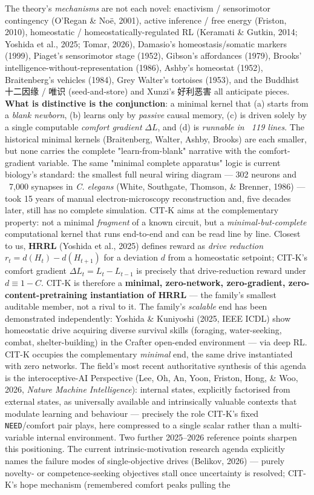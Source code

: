 \documentclass[11pt]{article}
\begin{document}
The theory's \emph{mechanisms} are not each novel: enactivism / sensorimotor contingency (O'Regan \& Noë, 2001), active inference / free energy (Friston, 2010), homeostatic / homeostatically-regulated RL (Keramati \& Gutkin, 2014; Yoshida et al., 2025; Tomar, 2026), Damasio's homeostasis/somatic markers (1999), Piaget's sensorimotor stage (1952), Gibson's affordances (1979), Brooks' intelligence-without-representation (1986), Ashby's homeostat (1952), Braitenberg's vehicles (1984), Grey Walter's tortoises (1953), and the Buddhist 十二因缘 / 唯识 (seed-and-store) and Xunzi's 好利恶害 all anticipate pieces. \textbf{What is distinctive is the conjunction}: a minimal kernel that (a) starts from a \emph{blank newborn}, (b) learns only by \emph{passive} causal memory, (c) is driven solely by a single computable \emph{comfort gradient} $\Delta L$, and (d) is \emph{runnable in ~119 lines}. The historical minimal kernels (Braitenberg, Walter, Ashby, Brooks) are each smaller, but none carries the complete "learn-from-blank" narrative with the comfort-gradient variable. The same "minimal complete apparatus" logic is current biology's standard: the smallest full neural wiring diagram — 302 neurons and ~7,000 synapses in \emph{C. elegans} (White, Southgate, Thomson, \& Brenner, 1986) — took 15 years of manual electron-microscopy reconstruction and, five decades later, still has no complete simulation. CIT-K aims at the complementary property: not a minimal \emph{fragment} of a known circuit, but a \emph{minimal-but-complete} computational kernel that runs end-to-end and can be read line by line. Closest to us, \textbf{HRRL} (Yoshida et al., 2025) defines reward as \emph{drive reduction} $r_t=d(H_t)-d(H_{t+1})$ for a deviation $d$ from a homeostatic setpoint; CIT-K's comfort gradient $\Delta L_t = L_t - L_{t-1}$ is precisely that drive-reduction reward under $d \equiv 1-C$. CIT-K is therefore a \textbf{minimal, zero-network, zero-gradient, zero-content-pretraining instantiation of HRRL} — the family's smallest auditable member, not a rival to it. The family's \emph{scalable} end has been demonstrated independently: Yoshida \& Kuniyoshi (2025, IEEE ICDL) show homeostatic drive acquiring diverse survival skills (foraging, water-seeking, combat, shelter-building) in the Crafter open-ended environment — via deep RL. CIT-K occupies the complementary \emph{minimal} end, the same drive instantiated with zero networks. The field's most recent authoritative synthesis of this agenda is the interoceptive-AI Perspective (Lee, Oh, An, Yoon, Friston, Hong, \& Woo, 2026, \emph{Nature Machine Intelligence}): internal states, explicitly factorised from external states, as universally available and intrinsically valuable contexts that modulate learning and behaviour — precisely the role CIT-K's fixed \texttt{NEED}/comfort pair plays, here compressed to a single scalar rather than a multi-variable internal environment. Two further 2025–2026 reference points sharpen this positioning. The current intrinsic-motivation research agenda explicitly names the failure modes of single-objective drives (Belikov, 2026) — purely novelty- or competence-seeking objectives stall once uncertainty is resolved; CIT-K's hope mechanism (remembered comfort peaks pulling the 
\end{document}
